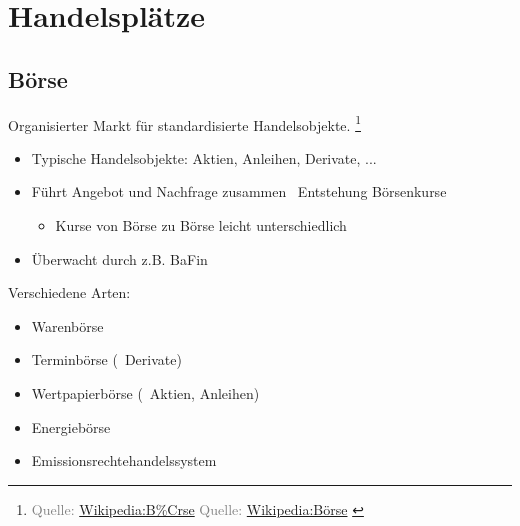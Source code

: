 \documentclass{beamer}
\let\oldfootnote\footnote
\renewcommand{\footnote}[1]
{%
	\oldfootnote
	{
		\tiny
		\textcolor{gray}{#1}
	}%
}
\newcommand{\citewiki}[2][]
{%
	\footnote
	{
		\ifthenelse{\isempty{#1}}
		{
			Quelle: \href{https://de.wikipedia.org/wiki/#2}{Wikipedia:#2}
		}
		{
			Quelle: \href{https://de.wikipedia.org/wiki/#2}{Wikipedia:#1}
		}
	}
}
\begin{document}
	\section{Handelsplätze}
	
		\begin{frame}
		\end{frame}
	
		\subsection{Börse}
		
			\begin{frame}
				\begin{definition}
					Organisierter Markt für standardisierte Handelsobjekte.\citewiki[Börse]{B\%Crse}
				\end{definition}
				\begin{itemize}
					\item Typische Handelsobjekte: Aktien, Anleihen, Derivate, ...
					\item Führt Angebot und Nachfrage zusammen \textrightarrow\ Entstehung Börsenkurse
					\begin{itemize}
						\item Kurse von Börse zu Börse leicht unterschiedlich
					\end{itemize}
					\item Überwacht durch z.B. BaFin
				\end{itemize}
			\end{frame}
		
			\begin{frame}
				Verschiedene Arten:
				\begin{itemize}
					\item Warenbörse
					\item Terminbörse (\textrightarrow\ Derivate)
					\item Wertpapierbörse (\textrightarrow\ Aktien, Anleihen)
					\item Energiebörse
					\item Emissionsrechtehandelssystem
				\end{itemize}
			\end{frame}
		
\end{document}
